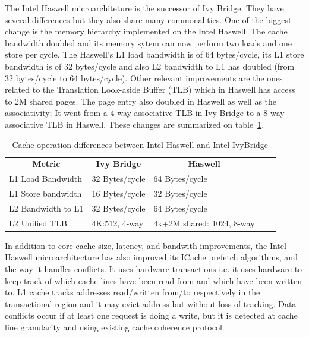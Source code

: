 The Intel Haswell microarchiteture is the successor of Ivy Bridge. They have several differences but they also share many commonalities. One of the biggest change is the memory hierarchy implemented on the Intel Haswell. The cache bandwidth doubled and its memory sytem can now perform two loads and one store per cycle. The Haswell's L1 load bandwidth is of 64 bytes/cycle, its L1 store bandwidth is of 32 bytes/cycle and also L2 bandwidth to L1 has doubled (from 32 bytes/cycle to 64 bytes/cycle). Other relevant improvements are the ones related to the Translation Look-aside Buffer (TLB) which in Haswell has access to 2M shared pages. The page entry also doubled in Haswell as well as the associativity; It went from a 4-way associative TLB in Ivy Bridge to a 8-way associative TLB in Haswell. These changes are summarized on table~\ref{tab:haswell_ivy}.

\begin{table}[ht]
\begin{tabular}{|l|l|l|ll}
\cline{1-3}
\multicolumn{1}{|c|}{\textbf{Metric}} & \multicolumn{1}{c|}{\textbf{Ivy Bridge}} & \multicolumn{1}{c|}{\textbf{Haswell}} &  &  \\ \cline{1-3}
L1 Load Bandwidth                     & 32 Bytes/cycle                           & 64 Bytes/cycle                        &  &  \\ \cline{1-3}
L1 Store bandwidth                    & 16 Bytes/cycle                           & 32 Bytes/cycle                        &  &  \\ \cline{1-3}
L2 Bandwidth to L1                    & 32 Bytes/cycle                           & 64 Bytes/cycle                        &  &  \\ \cline{1-3}
L2 Unified TLB                        & 4K:512, 4-way                            & 4k+2M shared: 1024, 8-way             &  &  \\ \cline{1-3}
\end{tabular}
\caption{Cache operation differences between Intel Haswell and Intel IvyBridge}
\label{tab:haswell_ivy}
\end{table}

In addition to core cache size, latency, and bandwith improvements, the Intel Haswell microarchitecture has also improved its ICache prefetch algorithms, and the way it handles conflicts. It uses hardware transactions i.e. it uses hardware to keep track of which cache lines have been read from and which have been written to. L1 cache tracks addresses read/written from/to respectively in the transactional region and it may evict address but without loss of tracking. Data conflicts occur if at least one request is doing a write, but it is detected at cache line granularity and using existing cache coherence protocol.

